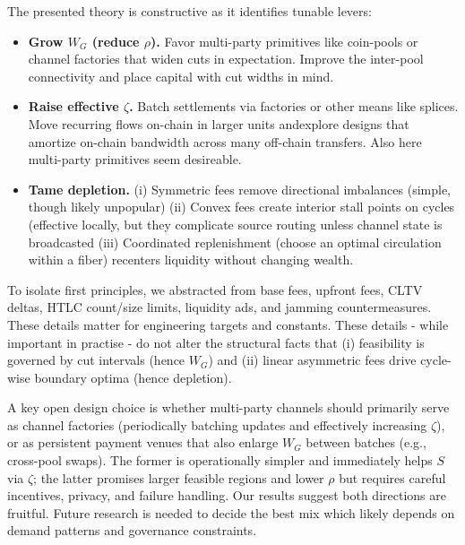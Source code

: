 \documentclass[10pt,twocolumn]{article}
\begin{document}
The presented theory is constructive as it identifies tunable levers:
\begin{itemize}
  \item \textbf{Grow $W_G$ (reduce $\rho$).} Favor multi-party primitives like coin-pools or channel factories that widen cuts in expectation. Improve the inter-pool connectivity and place capital with cut widths in mind.
  \item \textbf{Raise effective $\zeta$.} Batch settlements via factories or other means like splices. Move recurring flows on-chain in larger units andexplore designs that amortize on-chain bandwidth across many off-chain transfers. Also here multi-party primitives seem desireable.
  \item \textbf{Tame depletion.} (i) Symmetric fees remove directional imbalances (simple, though likely unpopular) (ii) Convex fees create interior stall points on cycles (effective locally, but they complicate source routing unless channel state is broadcasted (iii) Coordinated replenishment (choose an optimal circulation within a fiber) recenters liquidity without changing wealth.
\end{itemize}

To isolate first principles, we abstracted from base fees, upfront fees, CLTV deltas, HTLC count/size limits, liquidity ads, and jamming countermeasures. These details matter for engineering targets and constants. These details - while important in practise - do not alter the structural facts that (i) feasibility is governed by cut intervals (hence $W_G$) and (ii) linear asymmetric fees drive cycle-wise boundary optima (hence depletion).

A key open design choice is whether multi-party channels should primarily serve as channel factories (periodically batching updates and effectively increasing $\zeta$), or as persistent payment venues that also enlarge $W_G$ between batches (e.g., cross-pool swaps). The former is operationally simpler and immediately helps $S$ via $\zeta$; the latter promises larger feasible regions and lower $\rho$ but requires careful incentives, privacy, and failure handling. Our results suggest both directions are fruitful. Future research is needed to decide the best mix which likely depends on demand patterns and governance constraints.
\end{document}
